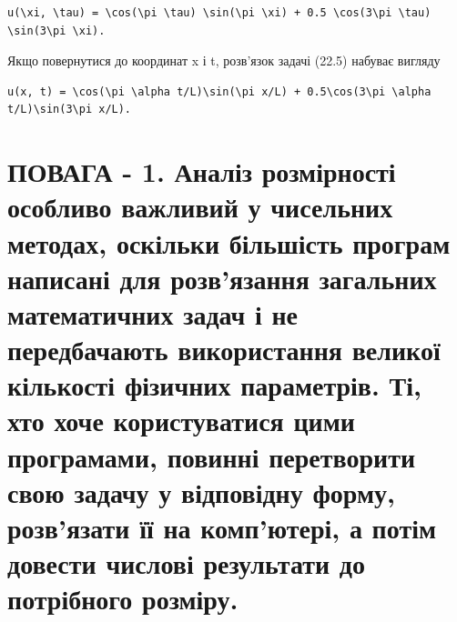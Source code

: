 \documentclass[
  ukrainian,
]{article}
\begin{document}
\begin{verbatim}
u(\xi, \tau) = \cos(\pi \tau) \sin(\pi \xi) + 0.5 \cos(3\pi \tau) \sin(3\pi \xi).
\end{verbatim}

Якщо повернутися до координат x і t, розв'язок задачі (22.5) набуває
вигляду

\begin{verbatim}
u(x, t) = \cos(\pi \alpha t/L)\sin(\pi x/L) + 0.5\cos(3\pi \alpha t/L)\sin(3\pi x/L).
\end{verbatim}

\section{ПОВАГА - 1. Аналіз розмірності особливо важливий у чисельних
методах, оскільки більшість програм написані для розв'язання загальних
математичних задач і не передбачають використання великої кількості
фізичних параметрів. Ті, хто хоче користуватися цими програмами, повинні
перетворити свою задачу у відповідну форму, розв'язати її на комп'ютері,
а потім довести числові результати до потрібного
розміру.}\label{ux43fux43eux432ux430ux433ux430---1.-ux430ux43dux430ux43bux456ux437-ux440ux43eux437ux43cux456ux440ux43dux43eux441ux442ux456-ux43eux441ux43eux431ux43bux438ux432ux43e-ux432ux430ux436ux43bux438ux432ux438ux439-ux443-ux447ux438ux441ux435ux43bux44cux43dux438ux445-ux43cux435ux442ux43eux434ux430ux445-ux43eux441ux43aux456ux43bux44cux43aux438-ux431ux456ux43bux44cux448ux456ux441ux442ux44c-ux43fux440ux43eux433ux440ux430ux43c-ux43dux430ux43fux438ux441ux430ux43dux456-ux434ux43bux44f-ux440ux43eux437ux432ux44fux437ux430ux43dux43dux44f-ux437ux430ux433ux430ux43bux44cux43dux438ux445-ux43cux430ux442ux435ux43cux430ux442ux438ux447ux43dux438ux445-ux437ux430ux434ux430ux447-ux456-ux43dux435-ux43fux435ux440ux435ux434ux431ux430ux447ux430ux44eux442ux44c-ux432ux438ux43aux43eux440ux438ux441ux442ux430ux43dux43dux44f-ux432ux435ux43bux438ux43aux43eux457-ux43aux456ux43bux44cux43aux43eux441ux442ux456-ux444ux456ux437ux438ux447ux43dux438ux445-ux43fux430ux440ux430ux43cux435ux442ux440ux456ux432.-ux442ux456-ux445ux442ux43e-ux445ux43eux447ux435-ux43aux43eux440ux438ux441ux442ux443ux432ux430ux442ux438ux441ux44f-ux446ux438ux43cux438-ux43fux440ux43eux433ux440ux430ux43cux430ux43cux438-ux43fux43eux432ux438ux43dux43dux456-ux43fux435ux440ux435ux442ux432ux43eux440ux438ux442ux438-ux441ux432ux43eux44e-ux437ux430ux434ux430ux447ux443-ux443-ux432ux456ux434ux43fux43eux432ux456ux434ux43dux443-ux444ux43eux440ux43cux443-ux440ux43eux437ux432ux44fux437ux430ux442ux438-ux457ux457-ux43dux430-ux43aux43eux43cux43fux44eux442ux435ux440ux456-ux430-ux43fux43eux442ux456ux43c-ux434ux43eux432ux435ux441ux442ux438-ux447ux438ux441ux43bux43eux432ux456-ux440ux435ux437ux443ux43bux44cux442ux430ux442ux438-ux434ux43e-ux43fux43eux442ux440ux456ux431ux43dux43eux433ux43e-ux440ux43eux437ux43cux456ux440ux443.}
\end{document}
